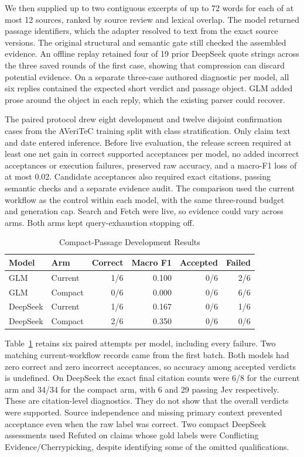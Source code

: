 \documentclass[conference]{IEEEtran}
\begin{document}
We then supplied up to two contiguous excerpts of up to 72 words for each of at most 12 sources, ranked by source review and lexical overlap. The model returned passage identifiers, which the adapter resolved to text from the exact source versions. The original structural and semantic gate still checked the assembled evidence. An offline replay retained four of 19 prior DeepSeek quote strings across the three saved rounds of the first case, showing that compression can discard potential evidence. On a separate three-case authored diagnostic per model, all six replies contained the expected short verdict and passage object. GLM added prose around the object in each reply, which the existing parser could recover.

The paired protocol drew eight development and twelve disjoint confirmation cases from the AVeriTeC training split with class stratification. Only claim text and date entered inference. Before live evaluation, the release screen required at least one net gain in correct supported acceptances per model, no added incorrect acceptances or execution failures, preserved raw accuracy, and a macro-F1 loss of at most 0.02. Candidate acceptances also required exact citations, passing semantic checks and a separate evidence audit. The comparison used the current workflow as the control within each model, with the same three-round budget and generation cap. Search and Fetch were live, so evidence could vary across arms. Both arms kept query-exhaustion stopping off.

\begin{table}[t]
\caption{Compact-Passage Development Results}
\label{tab:flash-dev}
\centering
\footnotesize
\begin{tabular}{@{}llrrrr@{}}
\toprule
Model & Arm & Correct & Macro F1 & Accepted & Failed\\
\midrule
GLM & Current & 1/6 & 0.100 & 0/6 & 2/6\\
GLM & Compact & 0/6 & 0.000 & 0/6 & 6/6\\
DeepSeek & Current & 1/6 & 0.167 & 0/6 & 1/6\\
DeepSeek & Compact & 2/6 & 0.350 & 0/6 & 0/6\\
\bottomrule
\end{tabular}
\end{table}

Table~\ref{tab:flash-dev} retains six paired attempts per model, including every failure. Two matching current-workflow records came from the first batch. Both models had zero correct and zero incorrect acceptances, so accuracy among accepted verdicts is undefined. On DeepSeek the exact final citation counts were 6/8 for the current arm and 34/34 for the compact arm, with 6 and 29 passing Jev respectively. These are citation-level diagnostics. They do not show that the overall verdicts were supported. Source independence and missing primary context prevented acceptance even when the raw label was correct. Two compact DeepSeek assessments used Refuted on claims whose gold labels were Conflicting Evidence/Cherrypicking, despite identifying some of the omitted qualifications.
\end{document}
